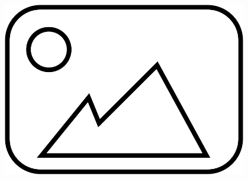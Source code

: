 \documentclass[aspectratio=169,10pt]{beamer}
\begin{document}
\begin{frame}
\begin{columns}[T]
\begin{column}{0.5\textwidth}
            \centering
            \includegraphics[width=0.8\textwidth]{placeholder.png}
            
        \end{column}
    \end{columns}
\end{frame}
\end{document}
